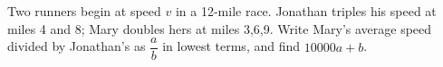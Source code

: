 Two runners begin at speed $ v $ in a 12-mile race. Jonathan triples his speed at miles 4 and 8; Mary doubles hers at miles 3,6,9. Write Mary's average speed divided by Jonathan's as $\dfrac{a}{b}$ in lowest terms, and find $ 10000a+b $.
